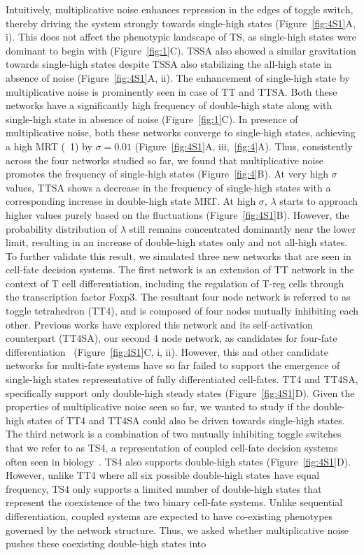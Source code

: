 \documentclass[11pt]{article}
\begin{document}
Intuitively, multiplicative noise enhances repression in the edges of toggle switch, thereby driving the system strongly towards single-high states (Figure~\ref{fig:4S1}A, i). This does not affect the phenotypic landscape of TS, as single-high states were dominant to begin with (Figure~\ref{fig:1}C). TSSA also showed a similar gravitation towards single-high states despite TSSA also stabilizing the all-high state in absence of noise (Figure~\ref{fig:4S1}A, ii). The enhancement of single-high state by multiplicative noise is prominently seen in case of TT and TTSA. Both these networks have a significantly high frequency of double-high state along with single-high state in absence of noise (Figure~\ref{fig:1}C). In presence of multiplicative noise, both these networks converge to single-high states, achieving a high MRT (~1) by $\sigma = 0.01$ (Figure~\ref{fig:4S1}A, iii,~\ref{fig:4}A). Thus, consistently across the four networks studied so far, we found that multiplicative noise promotes the frequency of single-high states (Figure~\ref{fig:4}B). At very high $\sigma$ values, TTSA shows a decrease in the frequency of single-high states with a corresponding increase in double-high state MRT. At high $\sigma$, $\lambda$ starts to approach higher values purely based on the fluctuations (Figure~\ref{fig:4S1}B). However, the probability distribution of $\lambda$ still remains concentrated dominantly near the lower limit, resulting in an increase of double-high states only and not all-high states. To further validate this result, we simulated three new networks that are seen in cell-fate decision systems. The first network is an extension of TT network in the context of T cell differentiation, including the regulation of T-reg cells through the transcription factor Foxp3. The resultant four node network is referred to as toggle tetrahedron (TT4), and is composed of four nodes mutually inhibiting each other. Previous works have explored this network and its self-activation counterpart (TT4SA), our second 4 node network, as candidates for four-fate differentiation~\cite{Duddu2024MultistabilityDifferentiation}  (Figure~\ref{fig:4S1}C, i, ii). However, this and other candidate networks for multi-fate systems have so far failed to support the emergence of single-high states representative of fully differentiated cell-fates. TT4 and TT4SA, specifically support only double-high steady states (Figure~\ref{fig:4S1}D). Given the properties of multiplicative noise seen so far, we wanted to study if the double-high states of TT4 and TT4SA could also be driven towards single-high states. The third network is a combination of two mutually inhibiting toggle switches that we refer to as TS4, a representation of coupled cell-fate decision systems often seen in biology~\cite{pasani2020hybrid, hari2022emergent}. TS4 also supports double-high states (Figure~\ref{fig:4S1}D). However, unlike TT4 where all six possible double-high states have equal frequency, TS4 only supports a limited number of double-high states that represent the coexistence of the two binary cell-fate systems. Unlike sequential differentiation, coupled systems are expected to have co-existing phenotypes governed by the network structure. Thus, we asked whether multiplicative noise pushes these coexisting double-high states into 
\end{document}
